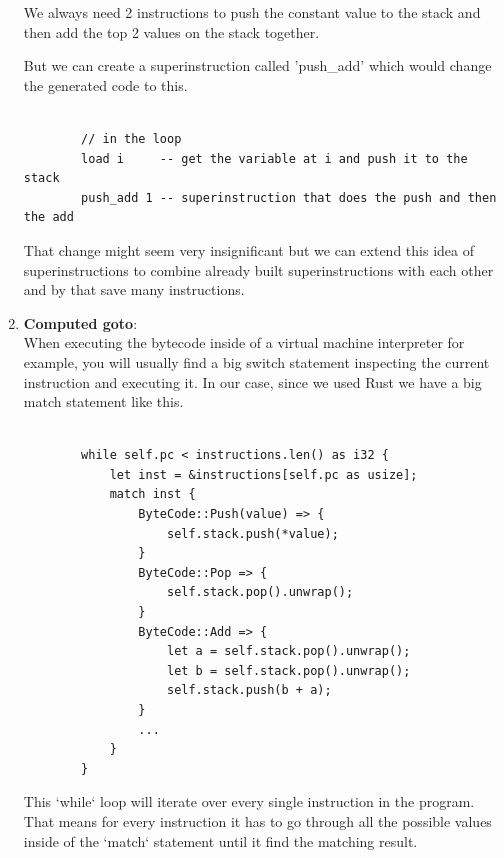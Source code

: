 \documentclass{article}
\begin{document}
\begin{enumerate}
\begin{verbatim}
        \end{verbatim}

        We always need 2 instructions to push the constant value to the stack and then add the top
        2 values on the stack together.

        But we can create a superinstruction called 'push\_add' which would change the generated
        code to this.

        \begin{verbatim}

        // in the loop
        load i     -- get the variable at i and push it to the stack
        push_add 1 -- superinstruction that does the push and then the add

        \end{verbatim}

        That change might seem very insignificant but we can extend this idea
        of superinstructions to combine already built superinstructions with
        each other and by that save many instructions.


    \item \textbf{Computed goto}:\\
    \label{it:goto}
        When executing the bytecode inside of a virtual machine interpreter for
        example, you will usually find a big switch statement inspecting the
        current instruction and executing it. In our case, since we used Rust
        we have a big match statement like this.

        \begin{verbatim}

        while self.pc < instructions.len() as i32 {
            let inst = &instructions[self.pc as usize];
            match inst {
                ByteCode::Push(value) => {
                    self.stack.push(*value);
                }
                ByteCode::Pop => {
                    self.stack.pop().unwrap();
                }
                ByteCode::Add => {
                    let a = self.stack.pop().unwrap();
                    let b = self.stack.pop().unwrap();
                    self.stack.push(b + a);
                }
                ...
            }
        }
        \end{verbatim}

        This `while` loop will iterate over every single instruction in the program. That means
        for every instruction it has to go through all the possible values inside of the `match`
        statement until it find the matching result.


\end{enumerate}
\end{document}
